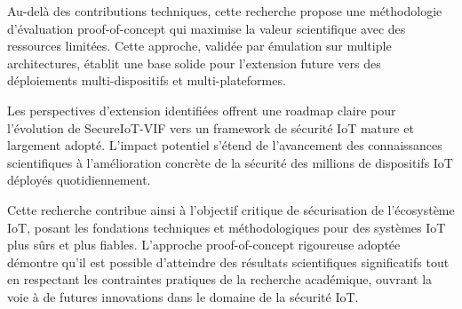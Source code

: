Au-delà des contributions techniques, cette recherche propose une méthodologie d'évaluation proof-of-concept qui maximise la valeur scientifique avec des ressources limitées. Cette approche, validée par émulation sur multiple architectures, établit une base solide pour l'extension future vers des déploiements multi-dispositifs et multi-plateformes.

Les perspectives d'extension identifiées offrent une roadmap claire pour l'évolution de SecureIoT-VIF vers un framework de sécurité IoT mature et largement adopté. L'impact potentiel s'étend de l'avancement des connaissances scientifiques à l'amélioration concrète de la sécurité des millions de dispositifs IoT déployés quotidiennement.

Cette recherche contribue ainsi à l'objectif critique de sécurisation de l'écosystème IoT, posant les fondations techniques et méthodologiques pour des systèmes IoT plus sûrs et plus fiables. L'approche proof-of-concept rigoureuse adoptée démontre qu'il est possible d'atteindre des résultats scientifiques significatifs tout en respectant les contraintes pratiques de la recherche académique, ouvrant la voie à de futures innovations dans le domaine de la sécurité IoT.